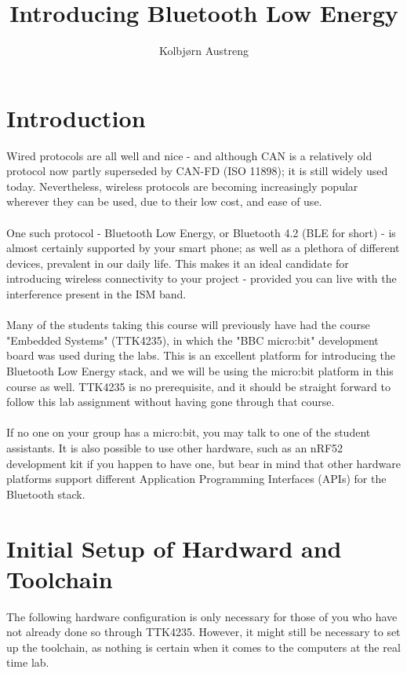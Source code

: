 \documentclass[11pt,a4paper]{article}
\title{Introducing Bluetooth Low Energy}
\author{Kolbjørn Austreng}
\date{}
\begin{document}
\maketitle

\renewcommand{\thesection}{\roman{section}}
\renewcommand{\thesubsection}{\roman{section}.\alph{subsection}}

\section{Introduction}
Wired protocols are all well and nice - and although CAN is a relatively old protocol now partly superseded by CAN-FD (ISO 11898); it is still widely used today. Nevertheless, wireless protocols are becoming increasingly popular wherever they can be used, due to their low cost, and ease of use.\\
\\
One such protocol - Bluetooth Low Energy, or Bluetooth 4.2 (BLE for short) - is almost certainly supported by your smart phone; as well as a plethora of different devices, prevalent in our daily life. This makes it an ideal candidate for introducing wireless connectivity to your project - provided you can live with the interference present in the ISM band.\\
\\
Many of the students taking this course will previously have had the course "Embedded Systems" (TTK4235), in which the "BBC micro:bit" development board was used during the labs. This is an excellent platform for introducing the Bluetooth Low Energy stack, and we will be using the micro:bit platform in this course as well. TTK4235 is no prerequisite, and it should be straight forward to follow this lab assignment without having gone through that course.\\
\\
If no one on your group has a micro:bit, you may talk to one of the student assistants. It is also possible to use other hardware, such as an nRF52 development kit if you happen to have one, but bear in mind that other hardware platforms support different Application Programming Interfaces (APIs) for the Bluetooth stack.

\newpage
\noindent
\section{Initial Setup of Hardward and Toolchain}
The following hardware configuration is only necessary for those of you who have not already done so through TTK4235. However, it might still be necessary to set up the toolchain, as nothing is certain when it comes to the computers at the real time lab.
\end{document}
